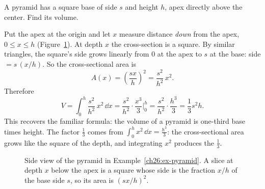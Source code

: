\begin{example}
\label{ch26:ex-pyramid}
A pyramid has a square base of side $s$ and height $h$, apex directly above the
center. Find its volume.

Put the apex at the origin and let $x$ measure distance \emph{down} from the apex,
$0 \le x \le h$ (Figure~\ref{ch26:fig-pyramid}). At depth $x$ the cross-section is
a square. By similar triangles,
the square's side grows linearly from $0$ at the apex to $s$ at the base:
side $= s\,(x/h)$. So the cross-sectional area is
\[
  A(x) = \left(\frac{s x}{h}\right)^2 = \frac{s^2}{h^2}\,x^2.
\]
Therefore
\[
  V = \int_0^h \frac{s^2}{h^2}\,x^2\,\dd x
    = \frac{s^2}{h^2}\cdot\frac{x^3}{3}\Big|_0^h
    = \frac{s^2}{h^2}\cdot\frac{h^3}{3}
    = \frac{1}{3}s^2 h.
\]
This recovers the familiar formula: the volume of a pyramid is one-third base
times height. The factor $\tfrac13$ comes from $\int_0^h x^2\,\dd x = \tfrac{h^3}{3}$:
the cross-sectional area grows like the square of the depth, and integrating
$x^2$ produces the $\tfrac13$.
\end{example}

\begin{figure}[htbp]
\centering
{}
\caption{Side view of the pyramid in Example~\ref{ch26:ex-pyramid}. A slice at
depth $x$ below the apex is a square whose side is the fraction $x/h$ of the base
side $s$, so its area is $(sx/h)^2$.}
\label{ch26:fig-pyramid}
\end{figure}

